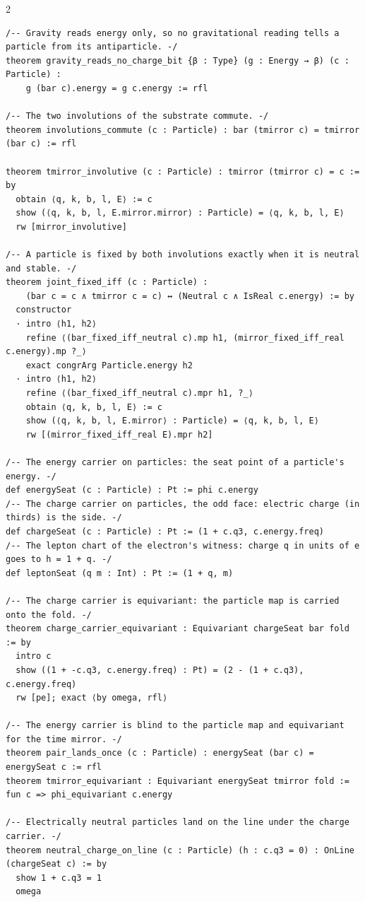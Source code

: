 \documentclass[10pt]{article}
\begin{document}
\begin{multicols}{2}
\begin{Verbatim}[fontsize=\fontsize{6.2}{7.2}\selectfont,breaklines,breakanywhere,breaksymbolleft={}]
/-- Gravity reads energy only, so no gravitational reading tells a particle from its antiparticle. -/
theorem gravity_reads_no_charge_bit {β : Type} (g : Energy → β) (c : Particle) :
    g (bar c).energy = g c.energy := rfl

/-- The two involutions of the substrate commute. -/
theorem involutions_commute (c : Particle) : bar (tmirror c) = tmirror (bar c) := rfl

theorem tmirror_involutive (c : Particle) : tmirror (tmirror c) = c := by
  obtain ⟨q, k, b, l, E⟩ := c
  show (⟨q, k, b, l, E.mirror.mirror⟩ : Particle) = ⟨q, k, b, l, E⟩
  rw [mirror_involutive]

/-- A particle is fixed by both involutions exactly when it is neutral and stable. -/
theorem joint_fixed_iff (c : Particle) :
    (bar c = c ∧ tmirror c = c) ↔ (Neutral c ∧ IsReal c.energy) := by
  constructor
  · intro ⟨h1, h2⟩
    refine ⟨(bar_fixed_iff_neutral c).mp h1, (mirror_fixed_iff_real c.energy).mp ?_⟩
    exact congrArg Particle.energy h2
  · intro ⟨h1, h2⟩
    refine ⟨(bar_fixed_iff_neutral c).mpr h1, ?_⟩
    obtain ⟨q, k, b, l, E⟩ := c
    show (⟨q, k, b, l, E.mirror⟩ : Particle) = ⟨q, k, b, l, E⟩
    rw [(mirror_fixed_iff_real E).mpr h2]

/-- The energy carrier on particles: the seat point of a particle's energy. -/
def energySeat (c : Particle) : Pt := phi c.energy
/-- The charge carrier on particles, the odd face: electric charge (in thirds) is the side. -/
def chargeSeat (c : Particle) : Pt := (1 + c.q3, c.energy.freq)
/-- The lepton chart of the electron's witness: charge q in units of e goes to h = 1 + q. -/
def leptonSeat (q m : Int) : Pt := (1 + q, m)

/-- The charge carrier is equivariant: the particle map is carried onto the fold. -/
theorem charge_carrier_equivariant : Equivariant chargeSeat bar fold := by
  intro c
  show ((1 + -c.q3, c.energy.freq) : Pt) = (2 - (1 + c.q3), c.energy.freq)
  rw [pe]; exact ⟨by omega, rfl⟩

/-- The energy carrier is blind to the particle map and equivariant for the time mirror. -/
theorem pair_lands_once (c : Particle) : energySeat (bar c) = energySeat c := rfl
theorem tmirror_equivariant : Equivariant energySeat tmirror fold := fun c => phi_equivariant c.energy

/-- Electrically neutral particles land on the line under the charge carrier. -/
theorem neutral_charge_on_line (c : Particle) (h : c.q3 = 0) : OnLine (chargeSeat c) := by
  show 1 + c.q3 = 1
  omega


\end{Verbatim}
\end{multicols}
\end{document}
